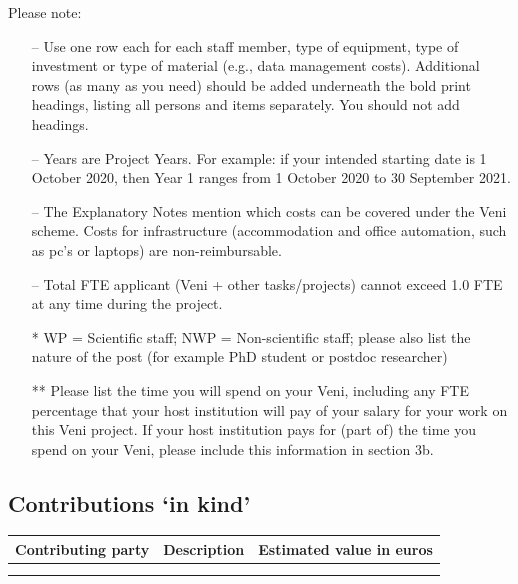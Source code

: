 \documentclass[10pt]{article}
\newcommand{\tableheadfont}{\bfseries\fontsize{10}{10}\selectfont\leavevmode\color{tableblue}}
\begin{document}
	Please note:
	\begin{itemize}
	    \item[--] Use one row each for each staff member, type of equipment, type of investment or type of material (e.g., data management costs). Additional rows (as many as you need) should be added underneath the bold print headings, listing all persons and items separately. You should not add headings.
	    
	    \item[--] Years are Project Years. For example: if your intended starting date is 1 October 2020, then Year 1 ranges from 1 October 2020 to 30 September 2021.
	    
	    \item[--] The Explanatory Notes mention which costs can be covered under the Veni scheme. Costs for infrastructure (accommodation and office automation, such as pc’s or laptops) are non-reimbursable.
	    
	    \item[--] Total FTE applicant (Veni + other tasks/projects) cannot exceed 1.0 FTE at any time during the project.
	    
		\item[*] WP = Scientific staff; NWP = Non-scientific staff; please also list the nature of the post (for example PhD student or postdoc researcher)
		\item[**] Please list the time you will spend on your Veni, including any FTE percentage that your host institution will pay of your salary for your work on this Veni project. If your host institution pays for (part of) the time you spend on your Veni, please include this information in section 3b.
	\end{itemize}

	\subsection{Contributions `in kind'}

	{\renewcommand{\arraystretch}{1.5}
	\begin{tabularx}{\linewidth}{|X|X|X|}
		\arrayrulecolor[gray]{0.4}\hline
		\rowcolor[gray]{0.95} {\tableheadfont Contributing party} & {\tableheadfont Description } & {\tableheadfont Estimated value in euros} \\\hline 
	 & & \\\hline
	 & & \\\hline
	\end{tabularx}
	}
\end{document}
